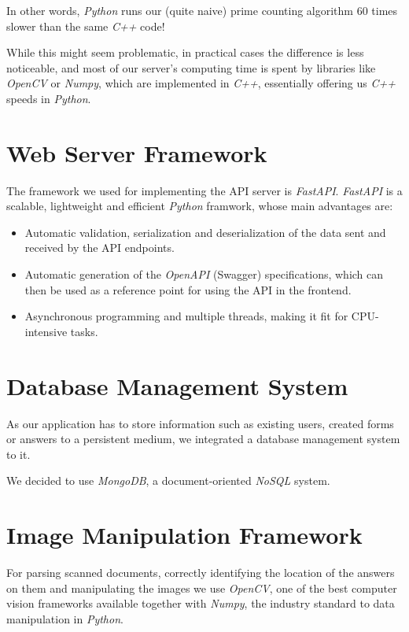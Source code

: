 \documentclass[12pt, a4paper]{report}
\begin{document}
In other words, \textit{Python} runs our (quite naive) prime counting algorithm $60$ times slower than the same \textit{C++} code!

While this might seem problematic, in practical cases the difference is less noticeable, and most of our server's computing time is spent by libraries like \textit{OpenCV} or \textit{Numpy}, which are implemented in \textit{C++}, essentially offering us \textit{C++} speeds in \textit{Python}.

\section{Web Server Framework}

The framework we used for implementing the API server is \textit{FastAPI}. \textit{FastAPI} is a scalable, lightweight and efficient \textit{Python} framwork, whose main advantages are:
\begin{itemize}
    \item Automatic validation, serialization and deserialization of the data sent and received by the API endpoints.
    \item Automatic generation of the \textit{OpenAPI} (Swagger) specifications, which can then be used as a reference point for using the API in the frontend.
    \item Asynchronous programming and multiple threads, making it fit for CPU-intensive tasks.
\end{itemize}

\section{Database Management System}

As our application has to store information such as existing users, created forms or answers to a persistent medium, we integrated a database management system to it.

We decided to use \textit{MongoDB}, a document-oriented \textit{NoSQL} system.

\section{Image Manipulation Framework}

For parsing scanned documents, correctly identifying the location of the answers on them and manipulating the images we use \textit{OpenCV}, one of the best computer vision frameworks available together with \textit{Numpy}, the industry standard to data manipulation in \textit{Python}.
\end{document}
